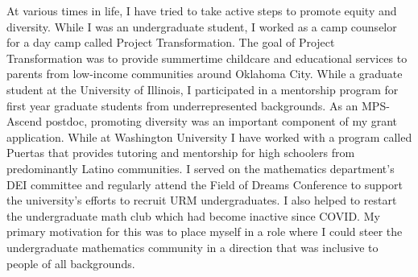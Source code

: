 \documentclass{article}
\begin{document}
At various times in life, I have tried to take active steps to promote equity and diversity. While I was an undergraduate student, I worked as a camp counselor for a day camp called Project Transformation. The goal of Project Transformation was to provide summertime childcare and educational services to parents from low-income communities around Oklahoma City. While a graduate student at the University of Illinois, I participated in a mentorship program for first year graduate students from underrepresented backgrounds. As an MPS-Ascend postdoc, promoting diversity was an important component of my grant application. While at Washington University I have worked with a program called Puertas that provides tutoring and mentorship for high schoolers from predominantly Latino communities. I served on the mathematics department's DEI committee and regularly attend the Field of Dreams Conference to support the university's efforts to recruit URM undergraduates. I also helped to restart the undergraduate math club which had become inactive since COVID. My primary motivation for this was to place myself in a role where I could steer the undergraduate mathematics community in a direction that was inclusive to people of all backgrounds.
\end{document}
